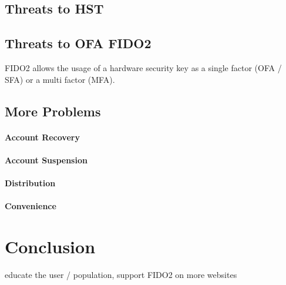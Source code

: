 \documentclass[runningheads]{llncs}
\begin{document}
\subsection{Threats to HST}


\subsection{Threats to OFA FIDO2}
FIDO2 allows the usage of a hardware security key as a single factor (OFA / SFA) or a multi factor (MFA).


\subsection{More Problems}
\paragraph{Account Recovery}
\paragraph{Account Suspension}
\paragraph{Distribution}

\paragraph{Convenience}

\section{Conclusion}
educate the user / population, support FIDO2 on more websites


\end{document}
